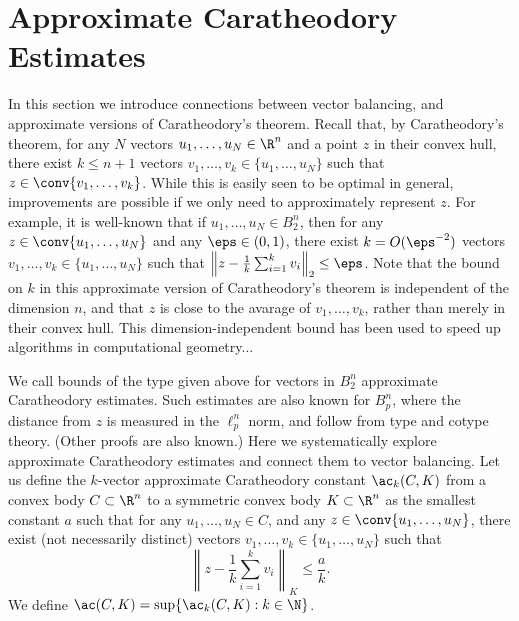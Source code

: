 \section{Approximate Caratheodory Estimates}
\label{sect:apx-carath}

In this section we introduce connections between vector balancing, and
approximate versions of Caratheodory's theorem. Recall that, by
Caratheodory's theorem, for any $N$ vectors $u_1, \ldots, u_N \in
\R^n$ and a point $z$ in their convex hull, there exist $k \le n+1$
vectors $v_1, \ldots, v_k \in \{u_1, \ldots, u_N\}$ such that $z \in
\conv\{v_1, \ldots, v_k\}$. While this is easily seen to be optimal in
general, improvements are possible if we only need to approximately
represent $z$. For example, it is well-known that if $u_1, \ldots, u_N
\in B_2^n$, then for any $z \in \conv\{u_1, \ldots, u_N\}$ and any
$\eps \in (0,1)$,  there exist $k = O(\eps^{-2})$ vectors $v_1,
\ldots, v_k \in \{u_1, \ldots, u_N\}$ such that $\left\|z - \frac1k
  \sum_{i = 1}^k{v_i}\right\|_2 \le \eps$. Note that the bound on $k$
in this approximate version of Caratheodory's theorem is independent
of the dimension $n$, and that $z$ is close to the avarage of $v_1,
\ldots, v_k$, rather than merely in their convex hull. This
dimension-independent bound has been used to speed up algorithms in
computational geometry...


We call bounds of the type given above for vectors in $B_2^n$
approximate Caratheodory estimates. Such estimates are also known for
$B_p^n$, where the distance from $z$ is measured in the $\ell_p^n$
norm, and follow from type and cotype theory. (Other proofs are also
known.) Here we systematically explore approximate Caratheodory
estimates and connect them to vector balancing. Let us define the
$k$-vector approximate Caratheodory constant $\ac_k(C,K)$ from a
convex body $C \subset \R^n$ to a symmetric convex body $K\subset
\R^n$ as the smallest constant $a$ such that for any $u_1, \ldots, u_N
\in C$, and any $z \in \conv\{u_1, \ldots, u_N\}$, there exist (not
necessarily distinct) vectors $v_1, \ldots, v_k \in \{u_1, \ldots,
u_N\}$ such that
\begin{equation}\label{eq:ac-defn}
\left\|z - \frac1k \sum_{i = 1}^k{v_i}\right\|_K \le \frac{a}{k}.
\end{equation}
We define $\ac(C,K) = \sup\{\ac_k(C, K): k \in \N\}$.


